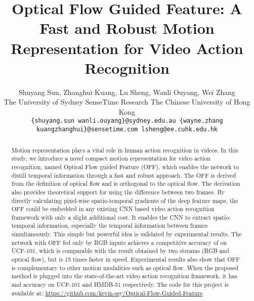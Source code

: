 \documentclass[10pt,twocolumn,letterpaper]{article}
\begin{document}
\title{Optical Flow Guided Feature: A Fast and Robust Motion Representation for Video Action Recognition}
\author{
Shuyang Sun, \hspace{1px} Zhanghui Kuang, \hspace{1px} Lu Sheng, \hspace{1px} Wanli Ouyang, \hspace{1px} Wei Zhang\\
The University of Sydney \hspace{3px} SenseTime Research \hspace{3px} The Chinese University of Hong Kong\\
{\tt\small \{shuyang.sun wanli.ouyang\}@sydney.edu.au \hspace{2px} \{wayne.zhang kuangzhanghui\}@sensetime.com\hspace{2px} lsheng@ee.cuhk.edu.hk}
}


\maketitle
\begin{abstract}
Motion representation plays a vital role in human action recognition in videos. In this study, we introduce a novel compact motion representation for video action recognition, named Optical Flow guided Feature (OFF), which enables the network to distill temporal information through a fast and robust approach.
The OFF is derived from the definition of optical flow and is orthogonal to the optical flow. The derivation also provides theoretical support for using the difference between two frames.
By directly calculating pixel-wise spatio-temporal gradients of the deep feature maps, the OFF could be embedded in any existing CNN based video action recognition framework with only a slight additional cost. It enables the CNN to extract spatio-temporal information, especially the temporal information between frames simultaneously. This simple but powerful idea is validated by experimental results. The network with OFF fed only by RGB inputs achieves a competitive accuracy of  on UCF-101, which is comparable with the result obtained by two streams (RGB and optical flow), but is 15 times faster in speed. Experimental results also show that OFF is complementary to other motion modalities such as optical flow. When the proposed method is plugged into the state-of-the-art video action recognition framework, it has  and  accuracy on UCF-101 and HMDB-51 respectively. The code for this project is available at: \href{https://github.com/kevin-ssy/Optical-Flow-Guided-Feature}{https://github.com/kevin-ssy/Optical-Flow-Guided-Feature}





\end{abstract}
\end{document}
